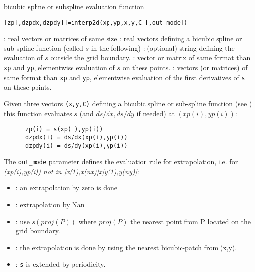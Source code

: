 

\begin{mandesc}
 {bicubic spline or subspline evaluation function}
\end{mandesc}

\begin{calling_sequence}
\begin{verbatim}
[zp[,dzpdx,dzpdy]]=interp2d(xp,yp,x,y,C [,out_mode])
\end{verbatim}
\end{calling_sequence}


\begin{parameters}
  \begin{varlist}
   : real vectors or matrices of same size
   : real vectors defining a bicubic spline or sub-spline function 
                (called $s$ in the following)
    : (optional) string defining the evaluation of $s$ outside 
                the grid boundary.
    : vector or matrix of same format than \verb!xp! and \verb!yp!, elementwise 
                evaluation of $s$ on these points.
    : vectors (or matrices) of same format than \verb!xp! and \verb!yp!, elementwise
                evaluation of the first derivatives of \verb!s! on these points.
  \end{varlist}
\end{parameters}

\begin{mandescription}
  Given three vectors \verb!(x,y,C)! defining a bicubic spline or sub-spline function
  (see  ) this function evaluates $s$ 
  (and $ds/dx, ds/dy$ if needed) at $(xp(i),yp(i))$:
    \begin{verbatim}
      zp(i) = s(xp(i),yp(i))   
      dzpdx(i) = ds/dx(xp(i),yp(i))
      dzpdy(i) = ds/dy(xp(i),yp(i))  
    \end{verbatim}

  The \verb!out_mode! parameter defines the evaluation rule for extrapolation,
  i.e. for {\em (xp(i),yp(i)) not in [x(1),x(nx)]x[y(1),y(ny)]}: 
  \begin{itemize}
       \item {} : an extrapolation by zero is done
       \item {} : extrapolation by Nan
       \item {} :  use $s(proj(P))$ where $proj(P)$ the nearest point from P located on the grid boundary.
        \item {} : the extrapolation is done by using the nearest bicubic-patch from (x,y).
       \item {} : \verb!s! is extended by periodicity. 
  \end{itemize}

\end{mandescription}

